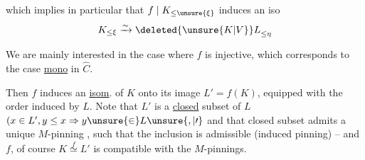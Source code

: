 which implies in particular that $f\mid K_{\leq\unsure{\xi}}$ induces an iso
\[
K_{\leq\xi}\xrightarrow{\sim}{\deleted{\unsure{K|V}}L}_{\leq\eta}
\]

We are mainly interested in the case where $f$ is injective, which corresponds to the  case  \uline{mono} in $\widehat C$.

Then $f$ induces an \uline{isom}. of $K$ onto  its image $L'=f(K)$, equipped with the order induced by $L$. Note that $L'$ is a \uline{closed} subset of $L$ $(x\in L',y\leq x\Rightarrow y\unsure{\in}L\unsure{,|\prime}$ and that  closed subset admits a unique $M$-pinning , such that the inclusion is admissible (induced pinning) -- and   $f$, of course $K\overset{f}{\simeq}L'$ is compatible with the $M$-pinnings.

